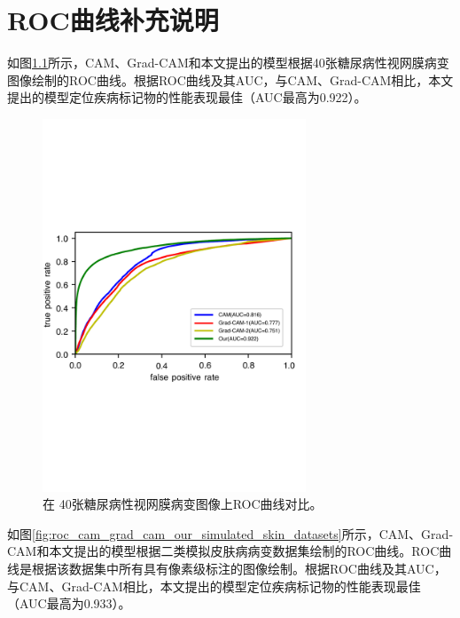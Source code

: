 \chapter{ROC曲线补充说明}\label{chapter:append1}
如图\ref{fig:roc_cam_grad_cam_our_diabetic_retinopathy}所示，CAM、Grad-CAM和本文提出的模型根据40张糖尿病性视网膜病变图像绘制的ROC曲线。根据ROC曲线及其AUC，与CAM、Grad-CAM相比，本文提出的模型定位疾病标记物的性能表现最佳（AUC最高为0.922）。
\begin{figure}[H]
	\centering
	\includegraphics[width=0.7\textwidth]{figure/ROC_cam_grad_cam_our_diabetic_retinopathy.pdf}
	\caption[在40张糖尿病性视网膜病变图像上ROC曲线对比]{在 40张糖尿病性视网膜病变图像上ROC曲线对比。}
	\label{fig:roc_cam_grad_cam_our_diabetic_retinopathy}
\end{figure}


如图\ref{fig:roc_cam_grad_cam_our_simulated_skin_datasets}所示，CAM、Grad-CAM和本文提出的模型根据二类模拟皮肤病病变数据集绘制的ROC曲线。ROC曲线是根据该数据集中所有具有像素级标注的图像绘制。根据ROC曲线及其AUC，与CAM、Grad-CAM相比，本文提出的模型定位疾病标记物的性能表现最佳（AUC最高为0.933）。


